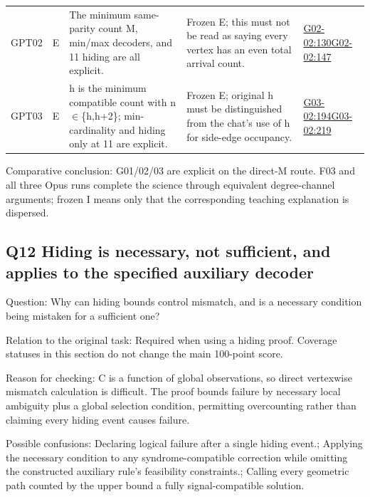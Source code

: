 \documentclass[11pt,a4paper]{article}
\begin{document}
{\begin{longtable}
{}GPT02 & E & The minimum same-parity count M,\allowbreak{} min/\allowbreak{}max decoders,\allowbreak{} and 11 hiding are all explicit. & Frozen E; this must not be read as saying every vertex has an even total arrival count. & \hyperref[src:G02-02]{G02-02:130}\newline \hyperref[src:G02-02]{G02-02:147}\tabularnewline
{}GPT03 & E & h is the minimum compatible count with n\ensuremath{\in}\{h,\allowbreak{}h+2\}; min-cardinality and hiding only at 11 are explicit. & Frozen E; original h must be distinguished from the chat’s use of h for side-edge occupancy. & \hyperref[src:G03-02]{G03-02:194}\newline \hyperref[src:G03-02]{G03-02:219}\tabularnewline
\bottomrule
\end{longtable}
}
Comparative conclusion: G01/\allowbreak{}02/\allowbreak{}03 are explicit on the direct-M route. F03 and all three Opus runs complete the science through equivalent degree-channel arguments; frozen I means only that the corresponding teaching explanation is dispersed.

\clearpage
\subsection{Q12 Hiding is necessary,\allowbreak{} not sufficient,\allowbreak{} and applies to the specified auxiliary decoder}
\label{aspect:Q12}
Question: Why can hiding bounds control mismatch,\allowbreak{} and is a necessary condition being mistaken for a sufficient one?

Relation to the original task: Required when using a hiding proof. Coverage statuses in this section do not change the main 100-point score.

Reason for checking: C is a function of global observations,\allowbreak{} so direct vertexwise mismatch calculation is difficult. The proof bounds failure by necessary local ambiguity plus a global selection condition,\allowbreak{} permitting overcounting rather than claiming every hiding event causes failure.

Possible confusions: Declaring logical failure after a single hiding event.; Applying the necessary condition to any syndrome-compatible correction while omitting the constructed auxiliary rule’s feasibility constraints.; Calling every geometric path counted by the upper bound a fully signal-compatible solution.
\end{document}
